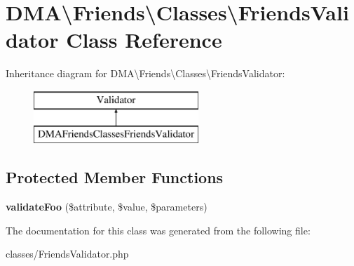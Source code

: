 \hypertarget{classDMA_1_1Friends_1_1Classes_1_1FriendsValidator}{}\section{D\+M\+A\textbackslash{}Friends\textbackslash{}Classes\textbackslash{}Friends\+Validator Class Reference}
\label{classDMA_1_1Friends_1_1Classes_1_1FriendsValidator}
Inheritance diagram for D\+M\+A\textbackslash{}Friends\textbackslash{}Classes\textbackslash{}Friends\+Validator\+:\begin{figure}[H]
\begin{center}
\leavevmode
\includegraphics[height=2.000000cm]{d3/def/classDMA_1_1Friends_1_1Classes_1_1FriendsValidator}
\end{center}
\end{figure}
\subsection*{Protected Member Functions}
\begin{DoxyCompactItemize}
\item 
\hypertarget{classDMA_1_1Friends_1_1Classes_1_1FriendsValidator_ac49e55669af8803c6b4434c850c06211}{}{\bfseries validate\+Foo} (\$attribute, \$value, \$parameters)\label{classDMA_1_1Friends_1_1Classes_1_1FriendsValidator_ac49e55669af8803c6b4434c850c06211}

\end{DoxyCompactItemize}


The documentation for this class was generated from the following file\+:\begin{DoxyCompactItemize}
\item 
classes/Friends\+Validator.\+php\end{DoxyCompactItemize}
